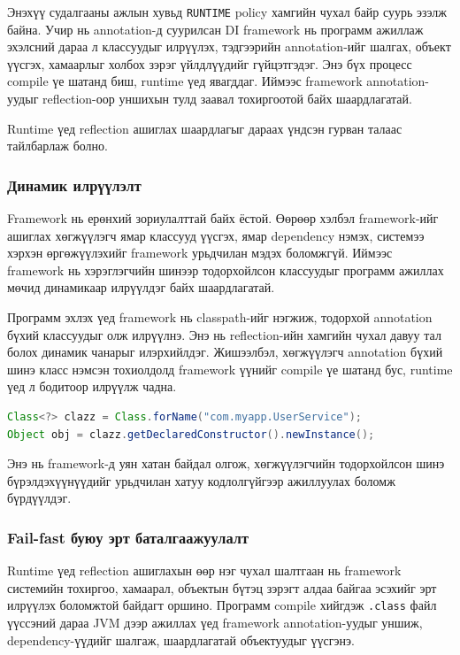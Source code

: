 Энэхүү судалгааны ажлын хувьд \texttt{RUNTIME} policy хамгийн чухал
байр суурь эзэлж байна. Учир нь annotation-д суурилсан DI framework нь
программ ажиллаж эхэлсний дараа л классуудыг илрүүлэх, тэдгээрийн
annotation-ийг шалгах, объект үүсгэх, хамаарлыг холбох зэрэг үйлдлүүдийг
гүйцэтгэдэг. Энэ бүх процесс compile үе шатанд биш, runtime үед
явагддаг. Иймээс framework annotation-уудыг reflection-оор уншихын тулд
заавал  тохиргоотой байх шаардлагатай.

Runtime үед reflection ашиглах шаардлагыг дараах үндсэн гурван талаас тайлбарлаж болно.

\subsubsection{Динамик илрүүлэлт}

Framework нь ерөнхий зориулалттай байх ёстой. Өөрөөр хэлбэл framework-ийг ашиглах хөгжүүлэгч ямар классууд үүсгэх, ямар dependency нэмэх, системээ хэрхэн өргөжүүлэхийг framework урьдчилан мэдэх боломжгүй. Иймээс framework нь хэрэглэгчийн шинээр тодорхойлсон классуудыг программ ажиллах мөчид динамикаар илрүүлдэг байх шаардлагатай.

Программ эхлэх үед framework нь classpath-ийг нэгжиж, тодорхой
annotation бүхий классуудыг олж илрүүлнэ. Энэ нь reflection-ийн
хамгийн чухал давуу тал болох динамик чанарыг илэрхийлдэг.
Жишээлбэл, хөгжүүлэгч  annotation бүхий шинэ
класс нэмсэн тохиолдолд framework үүнийг compile үе шатанд бус,
runtime үед л бодитоор илрүүлж чадна.

\begin{lstlisting}[language=Java, caption={Reflection ашиглан классыг динамикаар ачаалах жишээ}, label={lst:dynamic-loading}]
Class<?> clazz = Class.forName("com.myapp.UserService");
Object obj = clazz.getDeclaredConstructor().newInstance();
\end{lstlisting}

Энэ нь framework-д уян хатан байдал олгож, хөгжүүлэгчийн тодорхойлсон шинэ бүрэлдэхүүнүүдийг урьдчилан хатуу кодлолгүйгээр ажиллуулах боломж бүрдүүлдэг.

\subsubsection{Fail-fast буюу эрт баталгаажуулалт}

Runtime үед reflection ашиглахын өөр нэг чухал шалтгаан нь framework системийн тохиргоо, хамаарал, объектын бүтэц зэрэгт алдаа байгаа эсэхийг эрт илрүүлэх боломжтой байдагт оршино. Программ compile хийгдэж \texttt{.class} файл үүссэний дараа JVM дээр ажиллах үед framework annotation-уудыг уншиж, dependency-үүдийг шалгаж, шаардлагатай объектуудыг үүсгэнэ.

